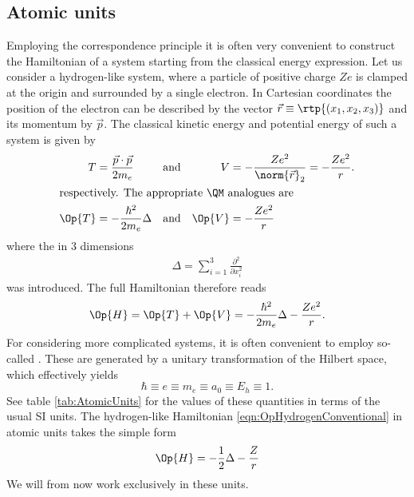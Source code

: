 \subsection{Atomic units}
Employing the correspondence principle it is often very convenient
to construct the \QM Hamiltonian of a system starting
from the classical energy expression.
Let us consider a hydrogen-like system,
where a particle of positive charge $Ze$
is clamped at the origin and surrounded by a single electron.
In Cartesian coordinates the position of the electron can be described
by the vector $\vec{r} \equiv \rtp{(x_1, x_2, x_3)}$ and its momentum by $\vec{p}$.
The classical kinetic energy and potential energy of such a system
is given by
\begin{align}
	T &= \frac{\vec{p} \cdot \vec{p}}{2 m_e} &
	&\text{and}&
	V &= - \frac{Ze^2}{\norm{\vec{r}}_2} = - \frac{Ze^2}{r}. \\
\intertext{respectively. The appropriate \QM analogues are}
	\Op{T} &= -\frac{\hbar^2}{2 m_e} \Delta &
	&\text{and}&
	\Op{V} &= - \frac{Ze^2}{r}
	\label{eqn:OpHydrogenConventional}
\end{align}
where the  in $3$ dimensions
\begin{align}
	\Delta = \sum_{i=1}^3 \frac{\partial^2}{\partial x_i^2}
	\label{eqn:LaplaceOperatorHydrogen}
\end{align}
was introduced. The full Hamiltonian therefore reads
\begin{equation}
	\Op{H} = \Op{T} + \Op{V} = -\frac{\hbar^2}{2 m_e} \Delta - \frac{Ze^2}{r}.
	\label{eqn:OpHydrogenFullUnits}
\end{equation}
For considering more complicated systems,
it is often convenient to employ so-called .
These are generated by a unitary transformation of the Hilbert space,
which effectively yields
\[ \hbar \equiv e \equiv m_e \equiv a_0 \equiv E_h \equiv 1. \]
See table \vref{tab:AtomicUnits} for the values of these quantities
in terms of the usual SI units.
The hydrogen-like Hamiltonian \vref{eqn:OpHydrogenConventional}
in atomic units takes the simple form
\begin{equation}
	\Op{H} = -\frac12 \Delta - \frac{Z}{r}
	\label{eqn:OpHydrogen}
\end{equation}
We will from now work exclusively in these units.
